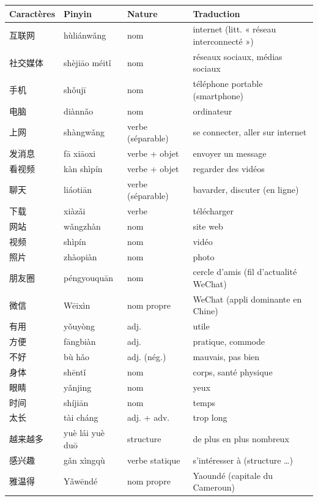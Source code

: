 \documentclass[11pt]{article}
\newcommand{\zh}[1]{\ifmmode\text{#1}\else{#1}\fi}
\begin{document}
\begin{center}
\begin{tabularx}{\linewidth}{|X|X|X|X|}
\hline
\rowcolor{popblueL} \textbf{Caractères} & \textbf{Pinyin} & \textbf{Nature} & \textbf{Traduction} \\
\hline
互联网 & hùliánwǎng & nom & internet (litt. « réseau interconnecté ») \\
\hline
社交媒体 & shèjiāo méitǐ & nom & réseaux sociaux, médias sociaux \\
\hline
手机 & shǒujī & nom & téléphone portable (smartphone) \\
\hline
电脑 & diànnǎo & nom & ordinateur \\
\hline
上网 & shàngwǎng & verbe (séparable) & se connecter, aller sur internet \\
\hline
发消息 & fā xiāoxi & verbe + objet & envoyer un message \\
\hline
看视频 & kàn shìpín & verbe + objet & regarder des vidéos \\
\hline
聊天 & liáotiān & verbe (séparable) & bavarder, discuter (en ligne) \\
\hline
下载 & xiàzǎi & verbe & télécharger \\
\hline
网站 & wǎngzhàn & nom & site web \\
\hline
视频 & shìpín & nom & vidéo \\
\hline
照片 & zhàopiàn & nom & photo \\
\hline
朋友圈 & péngyouquān & nom & cercle d'amis (fil d'actualité WeChat) \\
\hline
微信 & Wēixìn & nom propre & WeChat (appli dominante en Chine) \\
\hline
有用 & yǒuyòng & adj. & utile \\
\hline
方便 & fāngbiàn & adj. & pratique, commode \\
\hline
不好 & bù hǎo & adj. (nég.) & mauvais, pas bien \\
\hline
身体 & shēntǐ & nom & corps, santé physique \\
\hline
眼睛 & yǎnjing & nom & yeux \\
\hline
时间 & shíjiān & nom & temps \\
\hline
太长 & tài cháng & adj. + adv. & trop long \\
\hline
越来越多 & yuè lái yuè duō & structure & de plus en plus nombreux \\
\hline
感兴趣 & gǎn xìngqù & verbe statique & s'intéresser à (structure \zh{对}…\zh{感兴趣}) \\
\hline
雅温得 & Yǎwēndé & nom propre & Yaoundé (capitale du Cameroun) \\

\end{tabularx}
\end{center}
\end{document}
